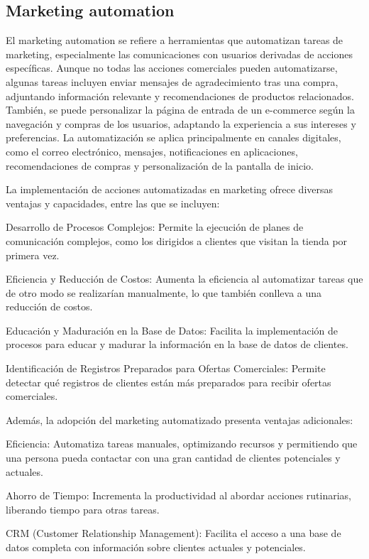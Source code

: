 \documentclass[
    a4paper, %
    10pt, %
    unnumberedsections, %
    twoside, %
]{LTJournalArticle}
\begin{document}
\subsection{Marketing automation}

El marketing automation se refiere a herramientas que automatizan tareas de marketing, especialmente las comunicaciones con usuarios derivadas de acciones específicas. Aunque no todas las acciones comerciales pueden automatizarse, algunas tareas incluyen enviar mensajes de agradecimiento tras una compra, adjuntando información relevante y recomendaciones de productos relacionados. También, se puede personalizar la página de entrada de un e-commerce según la navegación y compras de los usuarios, adaptando la experiencia a sus intereses y preferencias. La automatización se aplica principalmente en canales digitales, como el correo electrónico, mensajes, notificaciones en aplicaciones, recomendaciones de compras y personalización de la pantalla de inicio.

La implementación de acciones automatizadas en marketing ofrece diversas ventajas y capacidades, entre las que se incluyen:

Desarrollo de Procesos Complejos: Permite la ejecución de planes de comunicación complejos, como los dirigidos a clientes que visitan la tienda por primera vez.

Eficiencia y Reducción de Costos: Aumenta la eficiencia al automatizar tareas que de otro modo se realizarían manualmente, lo que también conlleva a una reducción de costos.

Educación y Maduración en la Base de Datos: Facilita la implementación de procesos para educar y madurar la información en la base de datos de clientes.

Identificación de Registros Preparados para Ofertas Comerciales: Permite detectar qué registros de clientes están más preparados para recibir ofertas comerciales.

Además, la adopción del marketing automatizado presenta ventajas adicionales:

Eficiencia: Automatiza tareas manuales, optimizando recursos y permitiendo que una persona pueda contactar con una gran cantidad de clientes potenciales y actuales.

Ahorro de Tiempo: Incrementa la productividad al abordar acciones rutinarias, liberando tiempo para otras tareas.

CRM (Customer Relationship Management): Facilita el acceso a una base de datos completa con información sobre clientes actuales y potenciales.
\end{document}

